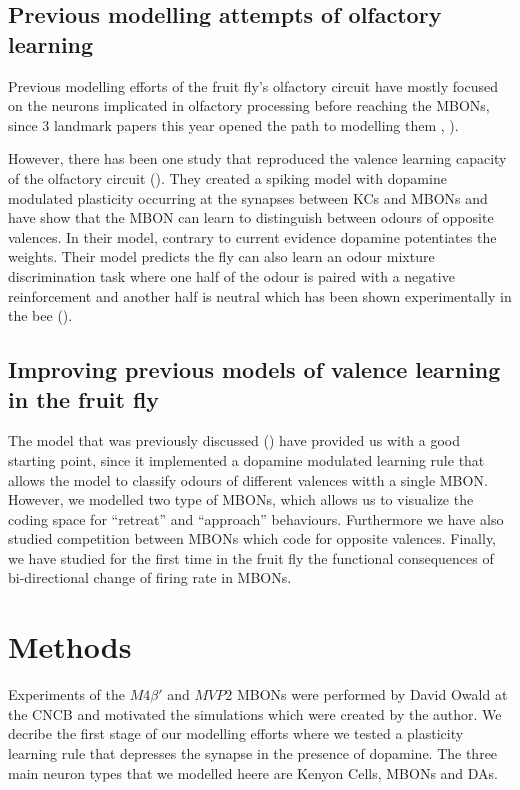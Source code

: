 \section{Previous modelling attempts of olfactory learning}

Previous modelling efforts of the fruit fly's olfactory circuit have
mostly focused on the neurons implicated in olfactory processing before
reaching the MBONs, since 3 landmark papers this year opened the path
to modelling them \citep{Hige:2015er,Owald:2015cn}, \citealp{Aso:2014bh}).

However, there has been one study that reproduced the valence learning
capacity of the olfactory circuit (\citealp{Wessnitzer:2011dj}).
They created a spiking model with dopamine modulated plasticity occurring
at the synapses between KCs and MBONs and have show that the MBON
can learn to distinguish between odours of opposite valences. In their
model, contrary to current evidence dopamine potentiates the weights.
Their model predicts the fly can also learn an odour mixture discrimination
task where one half of the odour is paired with a negative reinforcement
and another half is neutral which has been shown experimentally in
the bee (\citealp{Giurfa:2003dd}). 


\section{Improving previous models of valence learning in the fruit fly}

The model that was previously discussed (\citealp{Wessnitzer:2011dj})
have provided us with a good starting point, since it implemented
a dopamine modulated learning rule that allows the model to classify
odours of different valences witth a single MBON. However, we modelled
two type of MBONs, which allows us to visualize the coding space for
``retreat'' and ``approach'' behaviours. Furthermore we have also
studied competition between MBONs which code for opposite valences.
Finally, we have studied for the first time in the fruit fly the functional
consequences of bi-directional change of firing rate in MBONs. 


\chapter{Methods}

Experiments of the $M4\beta'$ and $MVP2$ MBONs were performed by
David Owald at the CNCB and motivated the simulations which were created
by the author. We decribe the first stage of our modelling efforts
where we tested a plasticity learning rule that depresses the synapse
in the presence of dopamine. The three main neuron types that we modelled
heere are Kenyon Cells, MBONs and DAs.

